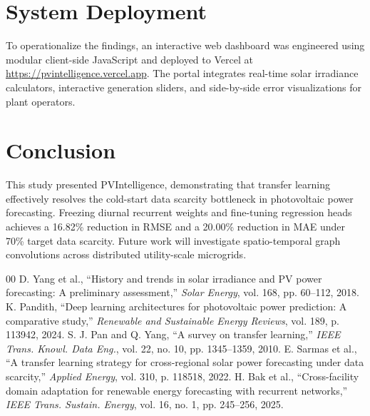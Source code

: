 \documentclass[conference]{IEEEtran}
\begin{document}
\section{System Deployment}
To operationalize the findings, an interactive web dashboard was engineered using modular client-side JavaScript and deployed to Vercel at \url{https://pvintelligence.vercel.app}. The portal integrates real-time solar irradiance calculators, interactive generation sliders, and side-by-side error visualizations for plant operators.

\section{Conclusion}
This study presented PVIntelligence, demonstrating that transfer learning effectively resolves the cold-start data scarcity bottleneck in photovoltaic power forecasting. Freezing diurnal recurrent weights and fine-tuning regression heads achieves a 16.82\% reduction in RMSE and a 20.00\% reduction in MAE under 70\% target data scarcity. Future work will investigate spatio-temporal graph convolutions across distributed utility-scale microgrids.

\begin{thebibliography}{00}
 D. Yang et al., ``History and trends in solar irradiance and PV power forecasting: A preliminary assessment,'' \textit{Solar Energy}, vol. 168, pp. 60--112, 2018.
 K. Pandith, ``Deep learning architectures for photovoltaic power prediction: A comparative study,'' \textit{Renewable and Sustainable Energy Reviews}, vol. 189, p. 113942, 2024.
 S. J. Pan and Q. Yang, ``A survey on transfer learning,'' \textit{IEEE Trans. Knowl. Data Eng.}, vol. 22, no. 10, pp. 1345--1359, 2010.
 E. Sarmas et al., ``A transfer learning strategy for cross-regional solar power forecasting under data scarcity,'' \textit{Applied Energy}, vol. 310, p. 118518, 2022.
 H. Bak et al., ``Cross-facility domain adaptation for renewable energy forecasting with recurrent networks,'' \textit{IEEE Trans. Sustain. Energy}, vol. 16, no. 1, pp. 245--256, 2025.
\end{thebibliography}
\end{document}
